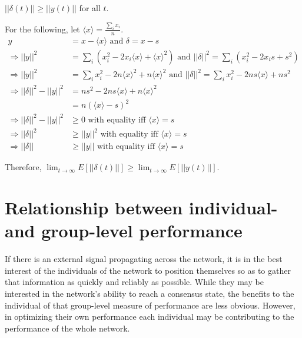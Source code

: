 \documentclass{article}
\begin{document}
\begin{claim}
$||\delta(t)||\geq||y(t)||$ for all $t$.
\end{claim}

\begin{pf}
For the following, let $\langle x\rangle =\frac{\sum_ix_i}{n}$.
\begin{align*}
y&=x-\langle x\rangle \text{ and } \delta=x-s
\\ \Rightarrow ||y||^2&=\sum_i(x_i^2-2x_i\langle x\rangle+\langle x\rangle^2) \text{ and } ||\delta||^2=\sum_i(x_i^2-2x_is+s^2)
\\ \Rightarrow ||y||^2&=\sum_ix_i^2-2n\langle x\rangle^2+n\langle x\rangle^2 \text{ and } ||\delta||^2=\sum_ix_i^2-2ns\langle x\rangle+ns^2
\\ \Rightarrow ||\delta||^2-||y||^2&=ns^2-2ns\langle x\rangle+n\langle x\rangle^2
\\ &=n(\langle x\rangle-s)^2
\\ \Rightarrow ||\delta||^2-||y||^2&\geq 0 \text{ with equality iff } \langle x\rangle=s
\\ \Rightarrow ||\delta||^2&\geq||y||^2 \text{ with equality iff } \langle x\rangle=s
\\ \Rightarrow ||\delta||&\geq ||y|| \text{ with equality iff } \langle x\rangle=s
\end{align*}

\end{pf}

Therefore, $\lim_{t\to\infty}E[||\delta(t)||]\geq\lim_{t\to\infty}E[||y(t)||]$.

\section{Relationship between individual- and group-level performance}
If there is an external signal propagating across the network, it is in the best interest of the individuals of the network to position themselves so as to gather that information as quickly and reliably as possible.  While they may be interested in the network's ability to reach a consensus state, the benefits to the individual of that group-level measure of performance are less obvious.  However, in optimizing their own performance each individual may be contributing to the performance of the whole network.
\end{document}
